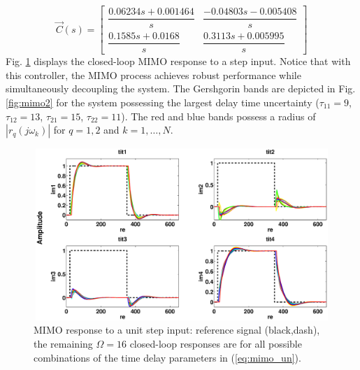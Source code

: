 \documentclass[default]{svmult}
\begin{document}
\begin{equation}
\renewcommand{\arraystretch}{2.2}
\vec{C}(s)=
\begin{bmatrix}
\dfrac{0.06234s + 0.001464}{s} & \dfrac{-0.04803s - 0.005408}{s} \\
\dfrac{0.1585s + 0.0168}{s} & \dfrac{0.3113s + 0.005995}{s}
\end{bmatrix}
\end{equation}
Fig. \ref{fig:mimo1} displays the closed-loop MIMO response to a step input. Notice that with this controller, the MIMO process achieves robust performance while simultaneously decoupling the system. The Gershgorin bands are depicted in Fig. \ref{fig:mimo2} for the system possessing the largest delay time uncertainty ($\tau_{11}=9$, $\tau_{12}=13$, $\tau_{21}=15$, $\tau_{22}=11$). The red and blue bands possess a radius of $|r_{q}(j\omega_k)|$ for $q=1,2$ and $k=1,\ldots,N$. 
\begin{figure}[H]
\centering
{}
\centerline{\includegraphics[width=13cm,height=6.5cm]{fig/test.eps}}
\caption{MIMO response to a unit step input: reference signal (black,dash), the remaining $\Omega=16$ closed-loop responses are for all possible combinations of the time delay parameters in (\ref{eq:mimo_un}).}
\label{fig:mimo1}
\end{figure}
\end{document}
